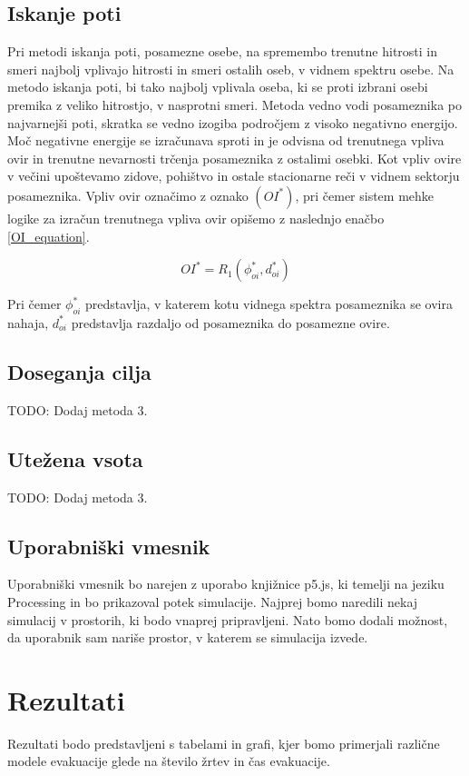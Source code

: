 \documentclass[9pt]{pnas-new}
\begin{document}
\subsection*{Iskanje poti}
Pri metodi iskanja poti, posamezne osebe, na spremembo trenutne hitrosti in smeri najbolj vplivajo hitrosti in smeri ostalih oseb, v vidnem spektru osebe. Na metodo iskanja poti, bi tako najbolj vplivala oseba, ki se proti izbrani osebi premika z veliko hitrostjo, v nasprotni smeri. Metoda vedno vodi posameznika po najvarnejši poti, skratka se vedno izogiba področjem z visoko negativno energijo. Moč negativne energije se izračunava sproti in je odvisna od trenutnega vpliva ovir in trenutne nevarnosti trčenja posameznika z ostalimi osebki. Kot vpliv ovire v večini upoštevamo zidove, pohištvo in ostale stacionarne reči v vidnem sektorju posameznika. Vpliv ovir označimo z oznako ${(OI^*)}$, pri čemer sistem mehke logike za izračun trenutnega vpliva ovir opišemo z naslednjo enačbo \ref{OI_equation}.

\begin{equation}
\label{OI_equation}
OI^* = R_{1}(\phi^*_{oi}, d^*_{oi})
\end{equation}

Pri čemer ${\phi^*_{oi}}$ predstavlja, v katerem kotu vidnega spektra posameznika se ovira nahaja, ${d^*_{oi}}$ predstavlja razdaljo od posameznika do posamezne ovire. 


\subsection*{Doseganja cilja}
TODO: Dodaj metoda 3.

\subsection*{Utežena vsota}
TODO: Dodaj metoda 3.

\subsection*{Uporabniški vmesnik}
Uporabniški vmesnik bo narejen z uporabo knjižnice p5.js, ki temelji na jeziku Processing in bo prikazoval potek simulacije. Najprej bomo naredili nekaj simulacij v prostorih, ki bodo vnaprej pripravljeni. Nato bomo dodali možnost, da uporabnik sam nariše prostor, v katerem se simulacija izvede.

\section*{Rezultati}
Rezultati bodo predstavljeni s tabelami in grafi, kjer bomo primerjali različne modele evakuacije glede na število žrtev in čas evakuacije. 
\end{document}
